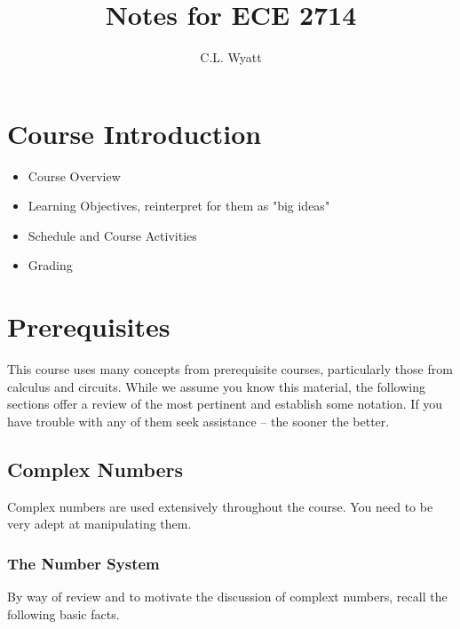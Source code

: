 \documentclass{article}
\title{Notes for ECE 2714}
\author{C.L. Wyatt}
\begin{document}
\maketitle
\newpage

\tableofcontents
\newpage

\setlength{\parindent}{0em}
\setlength{\parskip}{1em}

\section{Course Introduction}
\label{sec:intro}
\begin{itemize}
\item Course Overview
\item Learning Objectives, reinterpret for them as "big ideas"
\item Schedule and Course Activities
\item Grading
\end{itemize}

\newpage
\section{Prerequisites}

This course uses many concepts from prerequisite courses, particularly those from calculus and circuits. While we assume you know this material, the following sections offer a review of the most pertinent and establish some notation. If you have trouble with any of them seek assistance -- the sooner the better.

\subsection{Complex Numbers}

Complex numbers are used extensively throughout the course. You need to be very adept at manipulating them.

\subsubsection{The Number System}

By way of review and to motivate the discussion of complext numbers, recall the following basic facts.
\end{document}

